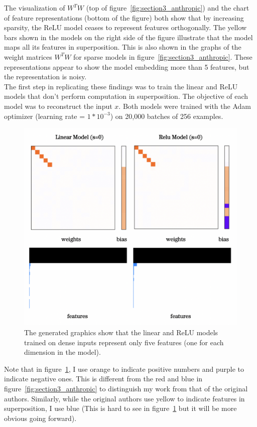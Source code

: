 \documentclass{article} %
\begin{document}
The visualization of $W^{T}W$ (top of figure~\ref{fig:section3_anthropic}) and the 
chart of feature representations (bottom of the figure) both show that by increasing sparsity, the 
ReLU model ceases to represent features orthogonally. The yellow bars shown in the models
on the right side of the figure illustrate that the model maps all its features 
in superposition. This is also shown in the graphs of the weight matrices $W^{T}W$ for
sparse models in figure~\ref{fig:section3_anthropic}. These 
representations appear to show the model embedding more than 5 features, but 
the representation is noisy.\\ 

The first step in replicating these findings was to train the linear and ReLU
models that don't perform computation in superposition. The
objective of each model was to reconstruct the input $x$. Both 
models were trained with the Adam optimizer (learning rate = $1*10^{-3}$) on 
20,000 batches of 256 examples.

\begin{figure}[h]
    \centering
    \includegraphics[width=0.4\linewidth]{demonstrating_superposition/images/relu_linear_0_sparsity.png}
    \captionsetup{font=footnotesize, width=0.7\linewidth} %
    \caption{The generated graphics show that the linear and ReLU models trained on
    dense inputs represent only five features (one for each dimension in the model).}
    \label{fig:relu_linear_0}
\end{figure}

Note that in figure~\ref{fig:relu_linear_0}, I use orange to indicate
positive numbers and purple to indicate negative ones. This is different from
the red and blue in figure~\ref{fig:section3_anthropic} to distinguish my work 
from that of the original authors. Similarly, while the original authors use 
yellow to indicate features in superposition, I use blue (This is hard to see in 
figure~\ref{fig:relu_linear_0} but it will be more obvious going forward).
\end{document}
